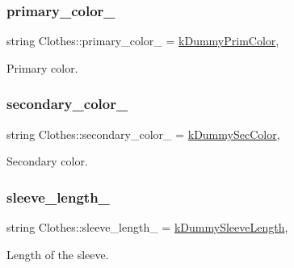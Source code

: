 \subsubsection{\texorpdfstring{primary\+\_\+color\+\_\+}{primary\_color\_}}
{\footnotesize\ttfamily string Clothes\+::primary\+\_\+color\+\_\+ = \mbox{\hyperlink{clothes_8h_a1b9c685d3bf2811d95b65e0d396c1344}{k\+Dummy\+Prim\+Color}}\hspace{0.3cm}{\ttfamily [protected]}, {\ttfamily [inherited]}}



Primary color. 

\mbox{\label{classClothes_ab8f55f67b956b25d71260cffcf273673}} 
\subsubsection{\texorpdfstring{secondary\+\_\+color\+\_\+}{secondary\_color\_}}
{\footnotesize\ttfamily string Clothes\+::secondary\+\_\+color\+\_\+ = \mbox{\hyperlink{clothes_8h_a71c39811135425d881af7760da63a73a}{k\+Dummy\+Sec\+Color}}\hspace{0.3cm}{\ttfamily [protected]}, {\ttfamily [inherited]}}



Secondary color. 

\mbox{\label{classClothes_a012aeb71e62ebaf9b5b5dd700cc8d5db}} 
\subsubsection{\texorpdfstring{sleeve\+\_\+length\+\_\+}{sleeve\_length\_}}
{\footnotesize\ttfamily string Clothes\+::sleeve\+\_\+length\+\_\+ = \mbox{\hyperlink{clothes_8h_a0f53dde6a2c4c344bb7da50655497350}{k\+Dummy\+Sleeve\+Length}}\hspace{0.3cm}{\ttfamily [protected]}, {\ttfamily [inherited]}}



Length of the sleeve. 

\mbox{\label{classClothes_aa85ed2b95110d8c477a1aca9cb403f98}} 

